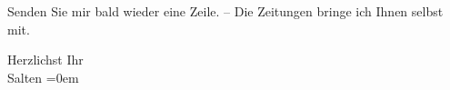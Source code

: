\pstart
           Senden Sie mir bald wieder eine Zeile. – Die Zeitungen bringe ich Ihnen selbst
               mit.\pend
           
\pstart
           Herzlichst Ihr {\\[\baselineskip]}\spacefill\mbox{Salten}\pend
           \leftskip=0em{}\endnumbering{}  \newcommand{\dateiname}{L03297}\newcommand{\titel}{Felix Salten an Arthur Schnitzler, [17. 8. 1899]}\newcommand{\editorInnen}{Martin Anton Müller und Laura Untner}
